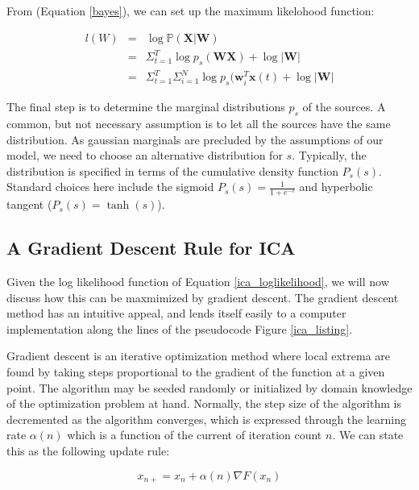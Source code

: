\documentclass[11pt, oneside, a4paper]{report}
\begin{document}
From (Equation \ref{bayes}), we can set up the maximum likelohood function:

\begin{equation}\label{ica_loglikelihood}
  \begin{array}{lll}
    l(W) & = &\log \mathbb{P}(\boldsymbol{X}|\boldsymbol{W}) \\
    & = & \Sigma_{t=1}^T \log p_s(\boldsymbol{W}\boldsymbol{X})+\log |\boldsymbol{W}|\\
    & = & \Sigma_{t=1}^T\Sigma_{i=1}^N\log p_s(\boldsymbol{w}_i^T\boldsymbol{x}(t)+\log |\boldsymbol{W}|
  \end{array}
\end{equation}

The final step is to determine the marginal distributions $p_s$ of the sources. 
A common, but not necessary assumption is to let all the sources have the same distribution.
As gaussian marginals are precluded by the assumptions of our model, we need to choose an
alternative distribution for $s$. Typically, the distribution is specified in terms of the 
cumulative density function $P_s(s)$. Standard choices here include the sigmoid 
$P_s(s) = \frac{1}{1+e^{-s}}$ and hyperbolic tangent ($P_s(s) = \tanh(s)$). 

\subsection{A Gradient Descent Rule for ICA}

Given the log likelihood function of Equation \ref{ica_loglikelihood},
we will now discuss how this can be maxmimized by gradient descent. 
The gradient descent method has an intuitive appeal, and  
lends itself easily to a computer implementation along the lines of
the pseudocode Figure \ref{ica_listing}. 

Gradient descent is an iterative optimization method where local extrema are found
by taking steps proportional to the gradient of the function at a given point. 
The algorithm may be seeded randomly or initialized by domain knowledge of the 
optimization problem at hand. Normally, the step size of the algorithm is decremented
as the algorithm converges, which is expressed through the learning rate $\alpha(n)$
which is a function of the current of iteration count $n$. We can state this as the following
update rule:


\begin{equation}
  \label{gradient_descent}
  x_{n+} = x_n + \alpha(n)\nabla F(x_n)
\end{equation}
\end{document}
